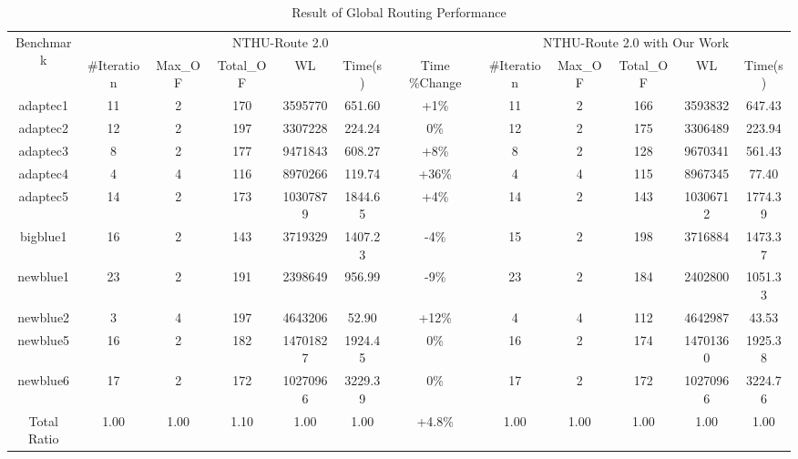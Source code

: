 \begin{table*}[htbp]
    \centering
    \caption{Result of Global Routing Performance}
    \label{tab:gr}
    \begin{tabular}{c|c|c|c|c|c|c|c|c|c|c|c}
        \toprule
        \multirow{2}{*}{Benchmark} & \multicolumn{6}{c|}{NTHU-Route 2.0}                                     & \multicolumn{5}{c}{NTHU-Route 2.0 with Our Work}      \\ \cline{2-12} 
                           & \#Iteration & Max\_OF & Total\_OF & WL       & Time(s) & Time \%Change & \#Iteration & Max\_OF & Total\_OF & WL       & Time(s) \\ \hline
        adaptec1                   & 11          & 2       & 170       & 3595770  & 651.60  & +1\%           & 11          & 2       & 166       & 3593832  & 647.43  \\ \hline
        adaptec2                   & 12          & 2       & 197       & 3307228  & 224.24  & 0\%            & 12          & 2       & 175       & 3306489  & 223.94  \\ \hline
        adaptec3                   & 8           & 2       & 177       & 9471843  & 608.27  & +8\%           & 8           & 2       & 128       & 9670341  & 561.43  \\ \hline
        adaptec4                   & 4           & 4       & 116       & 8970266  & 119.74  & +36\%          & 4           & 4       & 115       & 8967345  & 77.40   \\ \hline
        adaptec5                   & 14          & 2       & 173       & 10307879 & 1844.65 & +4\%           & 14          & 2       & 143       & 10306712 & 1774.39 \\ \hline
        bigblue1                   & 16          & 2       & 143       & 3719329  & 1407.23 & -4\%           & 15          & 2       & 198       & 3716884  & 1473.37 \\ \hline
        newblue1                   & 23          & 2       & 191       & 2398649  & 956.99  & -9\%           & 23          & 2       & 184       & 2402800  & 1051.33 \\ \hline
        newblue2                   & 3           & 4       & 197       & 4643206  & 52.90   & +12\%          & 4           & 4       & 112       & 4642987  & 43.53   \\ \hline
        newblue5                   & 16          & 2       & 182       & 14701827 & 1924.45 & 0\%            & 16          & 2       & 174       & 14701360 & 1925.38 \\ \hline
        newblue6                   & 17          & 2       & 172       & 10270966 & 3229.39 & 0\%            & 17          & 2       & 172       & 10270966 & 3224.76 \\ \hline
        Total Ratio                & 1.00        & 1.00    & 1.10      & 1.00     & 1.00    & +4.8\%         & 1.00        & 1.00    & 1.00      & 1.00     & 1.00    \\ \bottomrule
    \end{tabular}
\end{table*}


